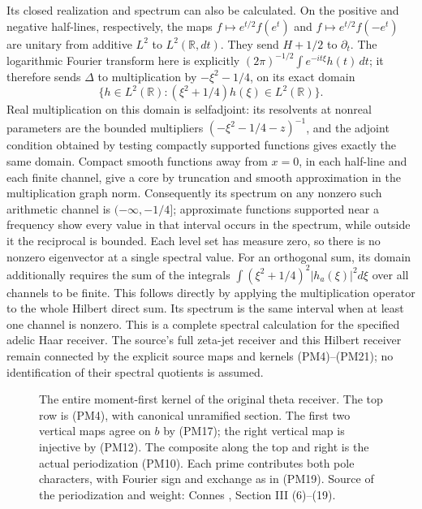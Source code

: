 \documentclass[11pt,a4paper]{article}
\theoremstyle{definition}\newtheorem{definition}[theorem]{Definition}
\begin{document}
Its closed realization and spectrum can also be calculated.
On the positive and negative half-lines, respectively, the maps
$f\mapsto e^{t/2}f(e^t)$ and $f\mapsto e^{t/2}f(-e^t)$
are unitary from additive $L^2$ to $L^2(\mathbb R,dt)$.
They send $H+1/2$ to $\partial_t$. The logarithmic Fourier transform here is explicitly
$(2\pi)^{-1/2}\int e^{-it\xi}h(t)\,dt$; it therefore sends $\Delta$ to multiplication by
$-\xi^2-1/4$, on its exact domain
\[
 \{h\in L^2(\mathbb R):
              (\xi^2+1/4)h(\xi)\in L^2(\mathbb R)\}.
 \tag{PM23}
\]
Real multiplication on this domain is selfadjoint: its
resolvents at nonreal parameters are the bounded multipliers
$(-\xi^2-1/4-z)^{-1}$, and the adjoint condition obtained by
testing compactly supported functions gives exactly the same
domain. Compact smooth functions away from $x=0$, in each
half-line and each finite channel, give a core by truncation
and smooth approximation in the multiplication graph norm.
Consequently its spectrum on any nonzero such arithmetic
channel is $(-\infty,-1/4]$; approximate functions supported
near a frequency show every value in that interval occurs
in the spectrum, while outside it the reciprocal is bounded.
Each level set has measure zero, so there is no nonzero
eigenvector at a single spectral value. For an orthogonal sum, its domain additionally requires the sum
of the integrals $\int(\xi^2+1/4)^2|h_a(\xi)|^2d\xi$ over all
channels to be finite. This follows directly by applying the
multiplication operator to the whole Hilbert direct sum. Its spectrum
is the same interval when at least one channel is nonzero.
This is a complete spectral calculation for the specified
adelic Haar receiver. The source's full zeta-jet receiver
and this Hilbert receiver remain connected by the explicit
source maps and kernels (PM4)--(PM21); no identification of
their spectral quotients is assumed.

\begin{figure}[ht]
\centering
{}
\caption{The entire moment-first kernel of the original theta
receiver. The top row is (PM4), with canonical unramified
section. The first two vertical maps agree on $b$ by (PM17);
the right vertical map is injective by (PM12). The composite
along the top and right is the actual periodization (PM10).
Each prime contributes both pole characters, with Fourier
sign and exchange as in (PM19). Source of the periodization
and weight: Connes \cite{Connes1998}, Section III (6)--(19).}
\end{figure}
\end{document}
